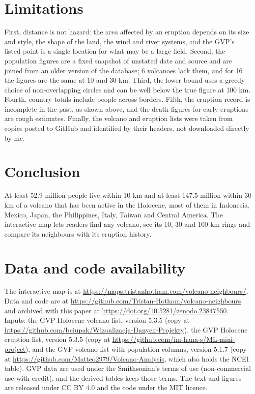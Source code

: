 \documentclass[11pt,a4paper]{article}
\begin{document}
\section{Limitations}
First, distance is not hazard: the area affected by an eruption depends on its size and style, the shape of the land, the wind and river systems, and the GVP's listed point is a single location for what may be a large field. Second, the population figures are a fixed snapshot of unstated date and source and are joined from an older version of the database; 6 volcanoes lack them, and for 16 the figures are the same at 10 and 30 km. Third, the lower bound uses a greedy choice of non-overlapping circles and can be well below the true figure at 100 km. Fourth, country totals include people across borders. Fifth, the eruption record is incomplete in the past, as shown above, and the death figures for early eruptions are rough estimates. Finally, the volcano and eruption lists were taken from copies posted to GitHub and identified by their headers, not downloaded directly by me.

\section{Conclusion}
At least 52.9 million people live within 10 km and at least 147.5 million within 30 km of a volcano that has been active in the Holocene, most of them in Indonesia, Mexico, Japan, the Philippines, Italy, Taiwan and Central America. The interactive map lets readers find any volcano, see its 10, 30 and 100 km rings and compare its neighbours with its eruption history.

\section*{Data and code availability}
The interactive map is at \url{https://maps.tristanhotham.com/volcano-neighbours/}. Data and code are at \url{https://github.com/Tristan-Hotham/volcano-neighbours} and archived with this paper at \url{https://doi.org/10.5281/zenodo.23847550}. Inputs: the GVP Holocene volcano list, version 5.3.5 (copy at \url{https://github.com/bciupak/Wizualizacja-Danych-Projekty}), the GVP Holocene eruption list, version 5.3.5 (copy at \url{https://github.com/im-hana-s/ML-mini-project}), and the GVP volcano list with population columns, version 5.1.7 (copy at \url{https://github.com/Matteo2979/Volcano-Analysis}, which also holds the NCEI table). GVP data are used under the Smithsonian's terms of use (non-commercial use with credit), and the derived tables keep those terms. The text and figures are released under CC BY 4.0 and the code under the MIT licence.
\end{document}
